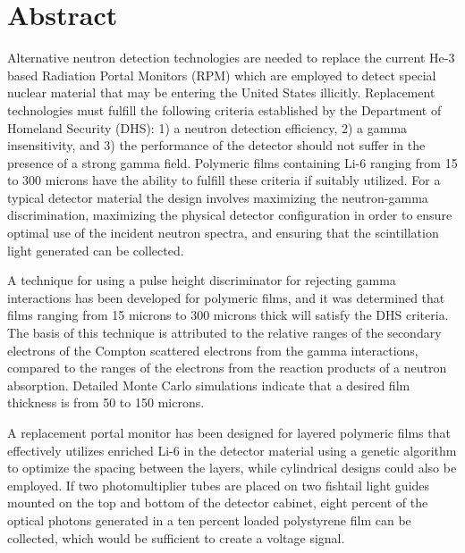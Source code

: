 \chapter*{Abstract}
\label{chap:abstract}
Alternative neutron detection technologies are needed to replace the current He-3 based Radiation Portal Monitors (RPM) which are employed to detect special nuclear material that may be entering the United States illicitly.
Replacement technologies must fulfill the following criteria established by the Department of Homeland Security (DHS): 1) a neutron detection efficiency, 2) a gamma insensitivity, and 3) the performance of the detector should not suffer in the presence of a strong gamma field.
Polymeric films containing Li-6 ranging from 15 to 300 microns have the ability to fulfill these criteria if suitably utilized.
For a typical detector material the design involves maximizing the neutron-gamma discrimination, maximizing the physical detector configuration in order to ensure optimal use of the incident neutron spectra, and ensuring that the scintillation light generated can be collected.

A technique for using a pulse height discriminator for rejecting gamma interactions has been developed for polymeric films, and it was determined that films ranging from 15 microns to 300 microns thick will satisfy the DHS criteria.
The basis of this technique is attributed to the relative ranges of the secondary electrons of the Compton scattered electrons from the gamma interactions, compared to the ranges of the electrons from the reaction products of a neutron absorption.
Detailed Monte Carlo simulations indicate that a desired film thickness is from 50 to 150 microns.

A replacement portal monitor has been designed for layered polymeric films that effectively utilizes enriched Li-6 in the detector material using a genetic algorithm to optimize the spacing between the layers, while cylindrical designs could also be employed.
If two photomultiplier tubes are placed on two fishtail light guides mounted on the top and bottom of the detector cabinet, eight percent of the optical photons generated in a ten percent loaded polystyrene film can be collected, which would be sufficient to create a voltage signal.
